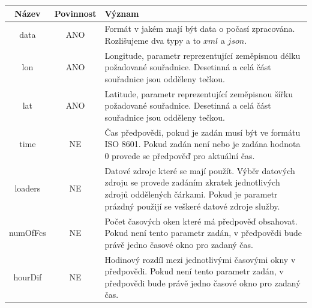 \documentclass[czech,bachelor,dept460,male,csharp,cpdeclaration]{diploma}
\begin{document}
	\begin{center}
		
		
		\begin{tabular}{c c p{13cm}}
			Název & Povinnost & Význam \\
			\midrule
			data & ANO & Formát v jakém mají být data o počasí zpracována. Rozlišujeme dva typy a to $xml$ a $json$.\\
			lon & ANO & Longitude, parametr reprezentující zeměpisnou délku požadované souřadnice. Desetinná a celá část souřadnice jsou odděleny tečkou.\\
			lat & ANO & Latitude, parametr reprezentující zeměpisnou šířku požadované souřadnice. Desetinná a celá část souřadnice jsou odděleny tečkou.\\
			time & NE & Čas předpovědi, pokud je zadán musí být ve formátu ISO 8601. Pokud zadán není nebo je zadána hodnota 0  provede se předpověď pro aktuální čas.\\ 
			loaders & NE & Datové zdroje které se mají použít. Výběr datových zdroju se provede zadáním zkratek jednotlivých zdrojů oddělených čárkami. Pokud je parametr prázdný použijí se veškeré datové zdroje služby. \\
			numOfFcs & NE & Počet časových oken které má předpověď obsahovat. Pokud není tento parametr zadán, v předpovědi bude právě jedno časové okno pro zadaný čas.\\
			hourDif & NE & Hodinový rozdíl mezi jednotlivými časovými okny v předpovědi. Pokud není tento parametr zadán, v předpovědi bude právě jedno časové okno pro zadaný čas.\\
		\end{tabular}
	\end{center}
\end{document}
